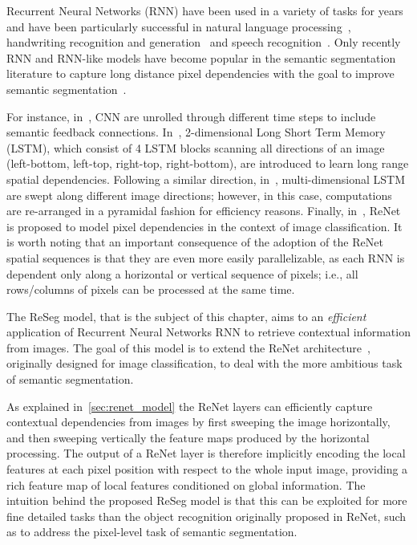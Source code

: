 Recurrent Neural Networks (RNN) have been used in a variety of tasks for years
and have been particularly successful in natural language
processing~\citep[see, e.g.,][]{Mikolov-thesis-2012,Sutskever-et-al-NIPS2014,
Cho2014}, handwriting recognition and generation~\citep{Graves+Schmidhuber-2009,
Graves-et-al-NIPS2007,Graves-arxiv2013} and speech recognition~\citep{
Chorowski-et-al-arxiv2014,Graves+Jaitly-ICML2014}. Only recently RNN and
RNN-like models have become popular in the semantic segmentation literature to
capture long distance pixel dependencies with the goal to improve semantic
segmentation~\cite{Pinheiro:2014,Gatta14-deepvision,chen2015semantic,
byeon2015scene,stollenga2015parallel}.

For instance, in~\cite{Pinheiro:2014, Gatta14-deepvision}, CNN are unrolled
through different time steps to include semantic feedback connections.
In~\cite{byeon2015scene}, 2-dimensional Long Short Term Memory (LSTM), which
consist of 4 LSTM blocks scanning all directions of an image (left-bottom,
left-top, right-top, right-bottom), are introduced to learn long range spatial
dependencies. Following a similar direction, in~\cite{stollenga2015parallel},
multi-dimensional LSTM are swept along different image directions; however, in
this case, computations are re-arranged in a pyramidal fashion for efficiency
reasons. Finally, in~\cite{visin2015renet}, ReNet is proposed to model pixel
dependencies in the context of image classification. It is worth noting that
an important consequence of the adoption of the ReNet spatial sequences is
that they are even more easily parallelizable, as each RNN is dependent only
along a horizontal or vertical sequence of pixels; i.e., all rows/columns of
pixels can be processed at the same time.

The ReSeg model, that is the subject of this chapter, aims to an {\em
efficient} application of Recurrent Neural Networks RNN to retrieve contextual
information from images. The goal of this model is to extend the ReNet
architecture~\cite{visin2015renet}, originally designed for image
classification, to deal with the more ambitious task of semantic segmentation.

As explained in~\autoref{sec:renet_model} the ReNet layers can efficiently
capture contextual dependencies from images by first sweeping the image
horizontally, and then sweeping vertically the feature maps produced by the
horizontal processing. The output of a ReNet layer is therefore implicitly
encoding the local features at each pixel position with respect to the whole
input image, providing a rich feature map of local features conditioned on
global information. The intuition behind the proposed ReSeg model is that this
can be exploited for more fine detailed tasks than the object recognition
originally proposed in ReNet, such as to address the pixel-level task of
semantic segmentation.

